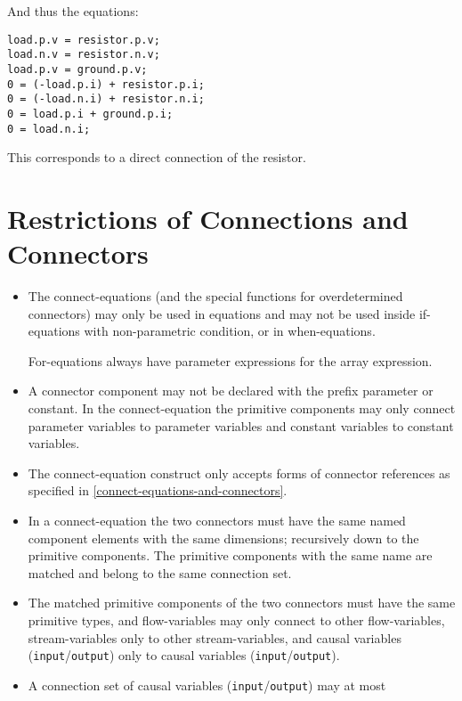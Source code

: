 \begin{example}
And thus the equations:
\begin{lstlisting}[language=modelica]
load.p.v = resistor.p.v;
load.n.v = resistor.n.v;
load.p.v = ground.p.v;
0 = (-load.p.i) + resistor.p.i;
0 = (-load.n.i) + resistor.n.i;
0 = load.p.i + ground.p.i;
0 = load.n.i;
\end{lstlisting}

This corresponds to a direct connection of the resistor.
\end{example}

\section{Restrictions of Connections and Connectors}

\begin{itemize}
\item
  The connect-equations (and the special functions for overdetermined
  connectors) may only be used in equations and may not be used inside
  if-equations with non-parametric condition, or in when-equations.
  \begin{nonnormative}
  For-equations always have parameter expressions for the array expression.
  \end{nonnormative}
\item
  A connector component may not be declared with the prefix parameter or
  constant. In the connect-equation the primitive components may only
  connect parameter variables to parameter variables and constant
  variables to constant variables.
\item
  The connect-equation construct only accepts forms of connector
  references as specified in \autoref{connect-equations-and-connectors}.
\item
  In a connect-equation the two connectors must have the same named
  component elements with the same dimensions; recursively down to the
  primitive components. The primitive components with the same name are
  matched and belong to the same connection set.
\item
  The matched primitive components of the two connectors must have the
  same primitive types, and flow-variables may only connect to other
  flow-variables, stream-variables only to other stream-variables, and
  causal variables (\lstinline!input!/\lstinline!output!) only to causal variables
  (\lstinline!input!/\lstinline!output!).
\item
  A connection set of causal variables (\lstinline!input!/\lstinline!output!) may at most

\end{itemize}

